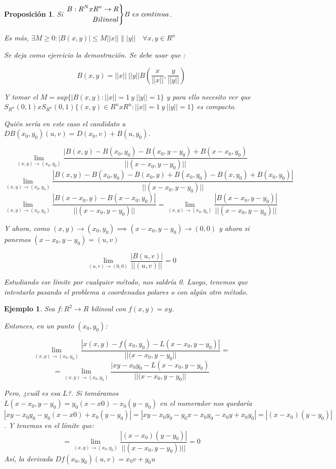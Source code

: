 \documentclass[11pt, a4paper, titlepage]{article}
\theoremstyle{theorem-style}
\newtheorem*{nprop}{Proposición}
\theoremstyle{definition-style}
\theoremstyle{remark-style}
\theoremstyle{example-style}
\newtheorem*{ejemplo}{Ejemplo}
\newenvironment{rcases}
  {\left.\begin{aligned}}
  {\end{aligned}\right\rbrace}
\begin{document}
\begin{nprop}
	Si $\begin{rcases}
	B: R^N x R^n \to R\\
	Bilineal
\end{rcases} B \ es \ continua$.

Es más, $\exists M \geq 0 : |B(x,y)| \leq M||x||\||y|| \quad \forall x,y \in R^n$
	
	Se deja como ejercicio la demostración. Se debe usar que :
	
	\[
	B(x,y) = ||x||\ ||y|| B(\frac{x}{||x||},\frac{y}{||y||}) 
	\]
	
	Y tomar el $M = sup\{|B(x,y): ||x|| = 1 \ y \ ||y|| = 1\}$ y para ello necesito ver que $S_{R^n}(0,1)xS_{R^n}(0,1)\{(x,y) \in R^nxR^n : ||x|| = 1 \ y \ ||y|| = 1\}$ es compacto.
	
	Quién sería en este caso el candidato a $DB(x_0,y_0)(u,v) = D(x_0,v)+B(u,y_0)$.
	
\[
\lim_{(x,y) \to (x_0,y_0)}\frac{|B(x,y) - B(x_0,y_0) - B(x_0,y-y_0) + B(x-x_0,y_0)}{||(x-x_0,y-y_0)||}
\]
\[
\lim_{(x,y) \to (x_0,y_0)}\frac{|B(x,y) - B(x_0,y_0) - B(x_0,y) + B(x_0,y_0) - B(x,y_0) + B(x_0,y_0)|}{||(x-x_0,y-y_0)||}
\]
\[
\lim_{(x,y) \to (x_0,y_0)}\frac{|B(x-x_0,y)- B(x-x_0,y_0)|}{||(x-x_0,y-y_0)||} = \lim_{(x,y) \to (x_0,y_0)}\frac{|B(x-x_0,y-y_0)|}{||(x-x_0,y-y_0)||}
\]

Y ahora, como $(x,y) \to (x_0,y_0) \implies (x-x_0,y-y_0) \to (0,0)$ y ahora si ponemos $(x-x_0,y-y_0) = (u,v)$

\[
 \lim_{(u,v) \to (0,0)}\frac{|B(u,v)|}{||(u,v)||} = 0
\]

Estudiando ese límite por cualquier método, nos saldría 0. Luego, tenemos que intentarlo pasando el problema a coordenadas polares o con algún otro método.
\end{nprop}

\begin{ejemplo}
	Sea $f:R^2 \to R$ bilineal con $f(x,y) = xy$.
	
	Entonces, en un punto $(x_0,y_0)$:
	
	\[
	\lim_{(x,y) \to (x_0, y_0)} \frac{|x(x,y) - f(x_0,y_0) - L(x-x_0, y-y_0)|}{||(x-x_0,y-y_0||} = 
	\]
	\[
	 =  \lim_{(x,y) \to (x_0,y_0)} \frac{|xy-x_0y_0 - L(x-x_0,y-y_0)}{||(x-x_0,y-y_0||}
	\]
	
	Pero, ¿cuál es esa $L$?. Si tomáramos $L(x-x_0,y-y_0) = y_0(x-x0) - x_0(y-y_0)$ en el numerador nos quedaría $|xy - x_0y_0 - y_0(x-x0) + x_0(y-y_0)| = |xy- x_0y_0 -y_0x -x_0y_0 - x_0y+x_0y_0 |= | (x-x_0)(y-y_0)|$. Y tenemos en el límite que:
	\[
	 = \lim_{(x,y) \to (x_0,y_0)} \frac{|(x-x_0)(y-y_0)|}{||(x-x_0,y-y_0))||} = 0
	\]
	Así, la derivada $Df(x_0,y_0)(u,v) = x_0v + y_0 u$
\end{ejemplo}
\end{document}
